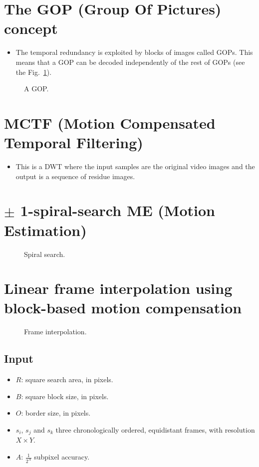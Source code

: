\section{The GOP (Group Of Pictures) concept}
\begin{itemize}
\tightlist
\item
  The temporal redundancy is exploited by blocks of images called GOPs.
  This means that a GOP can be decoded independently of the rest of
  GOPs (see the Fig.~\ref{fig:GOPs}).
\end{itemize}

\begin{figure}
  \caption{A GOP.}
  \label{fig:GOPs}
\end{figure}

\section{MCTF (Motion Compensated Temporal Filtering)}
\begin{itemize}
\tightlist
\item
  This is a DWT where the input samples are the original video images
  and the output is a sequence of residue images.
\end{itemize}

\section{$\pm$ 1-spiral-search ME (Motion Estimation)}
\begin{figure}[h]
  \caption{Spiral search.}
  \label{fig:spiral_search}
\end{figure}

\section{Linear frame interpolation using block-based motion compensation}
\label{sec:linear_frame_interpolation}
\begin{figure}[h]
  \caption{Frame interpolation.}
  \label{fig:frame_interpolation}
\end{figure}

\subsection*{Input}
\begin{itemize}
\tightlist
\item
  $R$: square search area, in pixels.
\item
  $B$: square block size, in pixels.
\item
  $O$: border size, in pixels.
\item
  $s_i$, $s_j$ and $s_k$ three chronologically ordered,
  equidistant frames, with resolution $X\times Y$.
\item
  $A$: $\frac{1}{2^A}$ subpixel accuracy.
\end{itemize}

